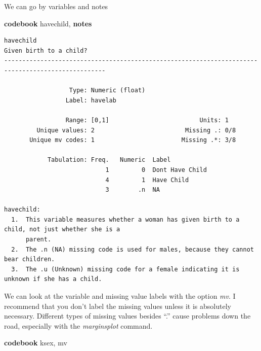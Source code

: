 \documentclass[
]{book}
\newenvironment{Shaded}{\begin{snugshade}}{\end{snugshade}}
\newcommand{\KeywordTok}[1]{\textcolor[rgb]{0.13,0.29,0.53}{\textbf{#1}}}
\newcommand{\NormalTok}[1]{#1}
\begin{document}
We can go by variables and notes

\begin{Shaded}
\begin{Highlighting}[]
\KeywordTok{codebook}\NormalTok{ havechild, }\KeywordTok{notes}
\end{Highlighting}
\end{Shaded}

\begin{verbatim}
havechild                                                                  Given birth to a child?
--------------------------------------------------------------------------------------------------

                  Type: Numeric (float)
                 Label: havelab

                 Range: [0,1]                         Units: 1
         Unique values: 2                         Missing .: 0/8
       Unique mv codes: 1                        Missing .*: 3/8

            Tabulation: Freq.   Numeric  Label
                            1         0  Dont Have Child
                            4         1  Have Child
                            3        .n  NA

havechild:
  1.  This variable measures whether a woman has given birth to a child, not just whether she is a
      parent.
  2.  The .n (NA) missing code is used for males, because they cannot bear children.
  3.  The .u (Unknown) missing code for a female indicating it is unknown if she has a child.
\end{verbatim}

We can look at the variable and missing value labels with the option \emph{mv}. I recommend that you don't label the missing values unless it is absolutely necessary. Different types of missing values besides ``.'' cause problems down the road, especially with the \emph{marginsplot} command.

\begin{Shaded}
\begin{Highlighting}[]
\KeywordTok{codebook}\NormalTok{ ksex, mv}
\end{Highlighting}
\end{Shaded}
\end{document}
